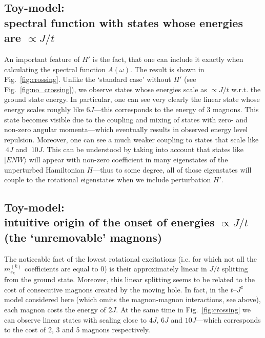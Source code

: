 \documentclass[10pt, a4paper, onecolumn]{article}
\newcommand{\ket}[1]{\vert #1 \rangle}
\begin{document}
\subsection{Toy-model:\\
spectral function with states whose energies are $\propto J/t$}

An important feature of $H'$ is the fact, that one can include it exactly when calculating the spectral function $A(\omega)$. The result is shown in Fig.~\ref{fig:crossing}. Unlike the `standard case' without $H'$ (see Fig.~\ref{fig:no_crossing}), we observe states whose energies scale as $\propto J/t$ w.r.t. the ground state energy. In particular, one can see very clearly the linear state whose energy scales roughly like $6J$---this corresponds to the energy of 3 magnons. This state becomes visible due to the coupling and mixing of states with zero- and non-zero angular momenta---which eventually results in observed energy level repulsion. Moreover, one can see a much weaker coupling to states that scale like $~4J$ and $~10J$. This can be understood by taking into account that states like $\ket{ENW}$ will appear with non-zero coefficient in many eigenstates of the unperturbed Hamiltonian $H$---thus to some degree, all of those eigenstates will couple to the rotational eigenstates when we include perturbation $H'$.




\subsection{Toy-model:\\
intuitive origin of the onset of energies $\propto J/t$ (the `unremovable' magnons)}

The noticeable fact of the lowest rotational excitations (i.e. for which not all the $m^{(k)}_{s_k}$ coefficients are equal to 0) is their approximately linear in $J/t$ splitting from the ground state. Moreover, this linear splitting seems to be related to the cost of consecutive magnons created by the moving hole. In fact, in the $t$--$J^z$ model considered here (which omits the magnon-magnon interactions, see above), each magnon costs the energy of $2J$. At the same time in Fig.~\ref{fig:crossing} we can observe linear states with scaling close to $4J$, $6J$ and $10J$---which corresponds to the cost of 2, 3 and 5 magnons respectively.
\end{document}
